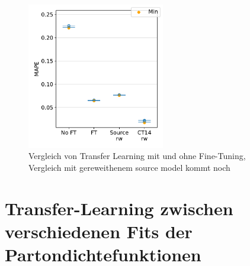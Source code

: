 \begin{figure}
	\centering
	\includegraphics[width=6cm]{graphics/25,29}
	\caption{Vergleich von Transfer Learning mit und ohne Fine-Tuning, Vergleich mit gereweithenem source model kommt noch}
\end{figure}



\section{Transfer-Learning zwischen verschiedenen Fits der Partondichtefunktionen}
